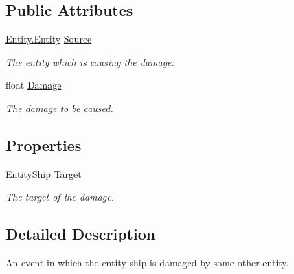 \subsection*{Public Attributes}
\begin{DoxyCompactItemize}
\item 
\hyperlink{class_skyrates_1_1_entity_1_1_entity}{Entity.\-Entity} \hyperlink{class_skyrates_1_1_game_1_1_event_1_1_event_entity_ship_damaged_ac1b8360317a40113c209e6e072e05fc4}{Source}
\begin{DoxyCompactList}\small\item\em The entity which is causing the damage. \end{DoxyCompactList}\item 
float \hyperlink{class_skyrates_1_1_game_1_1_event_1_1_event_entity_ship_damaged_a583f5c357fdeee25125bc549a57eb026}{Damage}
\begin{DoxyCompactList}\small\item\em The damage to be caused. \end{DoxyCompactList}\end{DoxyCompactItemize}
\subsection*{Properties}
\begin{DoxyCompactItemize}
\item 
\hyperlink{class_skyrates_1_1_entity_1_1_entity_ship}{Entity\-Ship} \hyperlink{class_skyrates_1_1_game_1_1_event_1_1_event_entity_ship_damaged_a7be9590b3c01d4390b94a9b428196504}{Target}
\begin{DoxyCompactList}\small\item\em The target of the damage. \end{DoxyCompactList}\end{DoxyCompactItemize}


\subsection{Detailed Description}
An event in which the entity ship is damaged by some other entity. 



